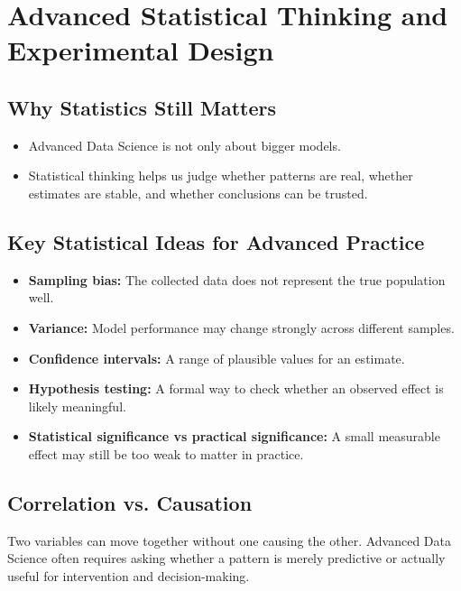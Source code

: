 \documentclass[11pt,a4paper]{article}
\begin{document}
\section{Advanced Statistical Thinking and Experimental Design}

\subsection{Why Statistics Still Matters}

\begin{itemize}[leftmargin=*]
  \item Advanced Data Science is not only about bigger models.
  \item Statistical thinking helps us judge whether patterns are real, whether estimates are stable, and whether conclusions can be trusted.
\end{itemize}

\subsection{Key Statistical Ideas for Advanced Practice}

\begin{itemize}[leftmargin=*]
  \item \textbf{Sampling bias:} The collected data does not represent the true population well.
  \item \textbf{Variance:} Model performance may change strongly across different samples.
  \item \textbf{Confidence intervals:} A range of plausible values for an estimate.
  \item \textbf{Hypothesis testing:} A formal way to check whether an observed effect is likely meaningful.
  \item \textbf{Statistical significance vs practical significance:} A small measurable effect may still be too weak to matter in practice.
\end{itemize}

\subsection{Correlation vs. Causation}

\begin{alertbox}
Two variables can move together without one causing the other. Advanced Data Science often requires asking whether a pattern is merely predictive or actually useful for intervention and decision-making.
\end{alertbox}
\end{document}
